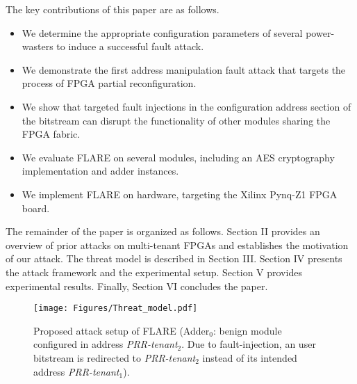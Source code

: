 The key contributions of this paper are as follows.
\begin{itemize}[leftmargin=*,topsep=0pt]
\item We determine the appropriate configuration parameters of several power-wasters to induce a successful fault attack.
    \item We demonstrate the first address manipulation fault attack that targets the process of FPGA partial reconfiguration.
    \item We show that targeted fault injections in the configuration address section of the bitstream can disrupt the functionality of other modules sharing the FPGA fabric.
    \item We evaluate FLARE on several modules, including an AES cryptography implementation and adder instances.
    \item We implement FLARE on hardware, targeting the Xilinx Pynq-Z1 FPGA board.
    
\end{itemize}

The remainder of the paper is organized as follows. Section II provides an overview of prior attacks on multi-tenant FPGAs and establishes the motivation of our attack. The threat model is described in Section III. Section IV presents the attack framework and the experimental setup. Section V provides experimental results. Finally, Section VI concludes the paper.
\vspace{-0.5cm}


\begin{figure}

\texttt{[image: Figures/Threat\_model.pdf]}

\caption{Proposed attack setup of FLARE (Adder$_0$: benign module configured in address \textit{PRR-tenant$_2$}. Due to fault-injection, an user bitstream is redirected to \textit{PRR-tenant$_2$} instead of its intended address \textit{PRR-tenant$_1$}).}
\label{flare}
\vspace{-0.6cm}

\end{figure}
